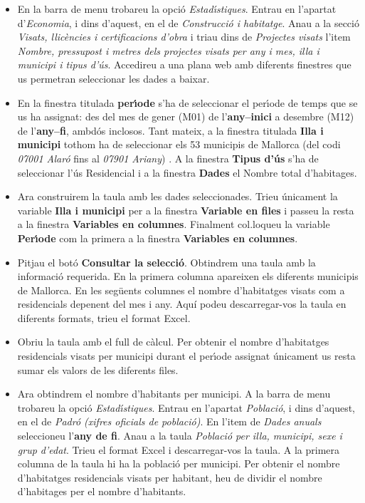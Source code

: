 \documentclass[11pt]{article}
\begin{document}
\begin{itemize}
\item [i)] En la barra de menu trobareu la opci\'o \textit{Estad\'{\i}stiques}. Entrau en l'apartat d'\textit{Economia}, i dins d'aquest, en el de \textit{Construcci\'o i habitatge}. 
Anau a la secci\'o \textit{Visats, llic\`encies i certificacions d'obra} i triau dins de \textit{Projectes visats} l'item
\textit{Nombre, pressupost i metres dels projectes visats per any i mes, illa i municipi i tipus d'\'us}. Accedireu a una plana web amb diferents finestres que us permetran seleccionar les dades a baixar.
\item [ii)] En la finestra titulada \textbf{per\'{\i}ode} s'ha de seleccionar el per\'{\i}ode de temps que se us ha assignat: des del mes de gener (M01) de l'\textbf{any--inici} a desembre (M12) de l'\textbf{any--fi}, ambd\'os inclosos. Tant mateix, a la finestra titulada \textbf{Illa i municipi} tothom ha de seleccionar els 53 municipis de Mallorca (del codi \textit{07001 Alar\'o} fins al \textit{07901 Ariany}) . A la finestra \textbf{Tipus d'\'us} s'ha de seleccionar l'\'us Residencial i a la finestra \textbf{Dades} el Nombre total d'habitages.
\item [iii)] Ara construirem la taula amb les dades seleccionades. Trieu \'unicament la variable \textbf{Illa i municipi} per a la finestra \textbf{Variable en files} i passeu la resta a la finestra \textbf{Variables en columnes}. Finalment col.loqueu la variable \textbf{Per\'{\i}ode} com la primera a la finestra \textbf{Variables en columnes}.
\item [iv)] Pitjau el bot\'o \textbf{Consultar la selecci\'o}. Obtindrem una taula amb la informaci\'o requerida. En la primera columna apareixen els diferents municipis de Mallorca. En les seg\"uents columnes el nombre d'habitatges visats com a residencials depenent del mes i any. Aqu\'i podeu descarregar-vos la taula en diferents formats, trieu el format Excel.
\item [v)] Obriu la taula amb el full de c\`alcul. Per obtenir el nombre d'habitatges residencials visats per municipi durant el per\'{\i}ode assignat \'unicament us resta sumar els valors de les diferents files. 
\item [vi)] Ara obtindrem el nombre d'habitants per municipi. A la barra de menu trobareu la opci\'o \textit{Estad\'{\i}stiques}. Entrau en l'apartat \textit{Poblaci\'o}, i dins d'aquest, en el de \textit{Padr\'o (xifres oficials de poblaci\'o)}. En l'item de \textit{Dades anuals} seleccioneu l'\textbf{any de fi}. Anau a la taula \textit{Poblaci\'o per illa, municipi, sexe i grup d'edat}. Trieu el format Excel i descarregar-vos la taula. A la primera columna de la taula hi ha la poblaci\'o per municipi. Per obtenir el nombre d'habitatges residencials visats per habitant, heu de dividir el nombre d'habitages per el nombre d'habitants. 
\end{itemize}
\end{document}
